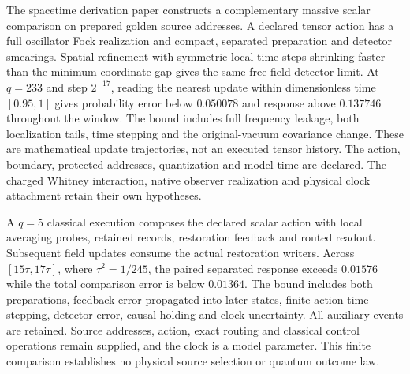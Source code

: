 \documentclass[11pt]{article}
\begin{document}
The spacetime derivation paper constructs a complementary massive scalar
comparison on prepared golden source addresses. A declared tensor action has
a full oscillator Fock realization and compact, separated preparation and
detector smearings. Spatial refinement with symmetric local time steps
shrinking faster than the minimum coordinate gap gives the same free-field
detector limit. At $q=233$ and step $2^{-17}$,
reading the nearest update within dimensionless time $[0.95,1]$ gives
probability error below $0.050078$ and response above $0.137746$ throughout
the window. The bound includes full frequency leakage, both localization
tails, time stepping and the original-vacuum covariance change. These are
mathematical update trajectories, not an executed tensor history.
The action, boundary, protected addresses, quantization and model time are
declared. The charged Whitney interaction, native observer realization and
physical clock attachment retain their own hypotheses.

A $q=5$ classical execution composes the declared scalar action with local
averaging probes, retained records, restoration feedback and routed readout.
Subsequent field updates consume the actual restoration writers. Across
$[15\tau,17\tau]$, where $\tau^2=1/245$, the paired separated response
exceeds $0.01576$ while the total comparison error is below $0.01364$.
The bound includes both preparations, feedback error propagated into later
states, finite-action time stepping, detector error, causal holding and clock
uncertainty. All auxiliary events are retained. Source addresses, action,
exact routing and classical control operations remain supplied, and the
clock is a model parameter. This finite comparison establishes no physical
source selection or quantum outcome law.



\end{document}

